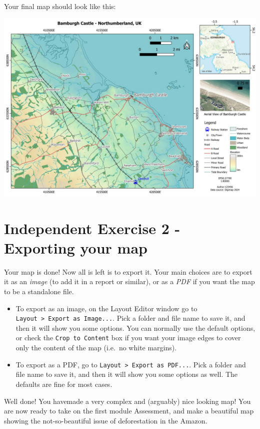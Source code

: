 \documentclass[
  letterpaper,
  DIV=11,
  numbers=noendperiod]{scrreprt}
\begin{document}
Your final map should look like this:

\includegraphics{images/lab_8/lab8_fig21_done.jpg}

\section{Independent Exercise 2 - Exporting your
map}\label{independent-exercise-2---exporting-your-map}

Your map is done! Now all is left is to export it. Your main choices are
to export it as an \emph{image} (to add it in a report or similar), or
as a \emph{PDF} if you want the map to be a standalone file.

\begin{itemize}
\item
  To export as an image, on the Layout Editor window go to
  \texttt{Layout\ \textgreater{}\ Export\ as\ Image...}. Pick a folder
  and file name to save it, and then it will show you some options. You
  can normally use the default options, or check the
  \texttt{Crop\ to\ Content} box if you want your image edges to cover
  only the content of the map (i.e.~no white margins).
\item
  To export as a PDF, go to
  \texttt{Layout\ \textgreater{}\ Export\ as\ PDF...}. Pick a folder and
  file name to save it, and then it will show you some options as well.
  The defaults are fine for most cases.
\end{itemize}

Well done! You havemade a very complex and (arguably) nice looking map!
You are now ready to take on the first module Assessment, and make a
beautiful map showing the not-so-beautiful issue of deforestation in the
Amazon.
\end{document}
